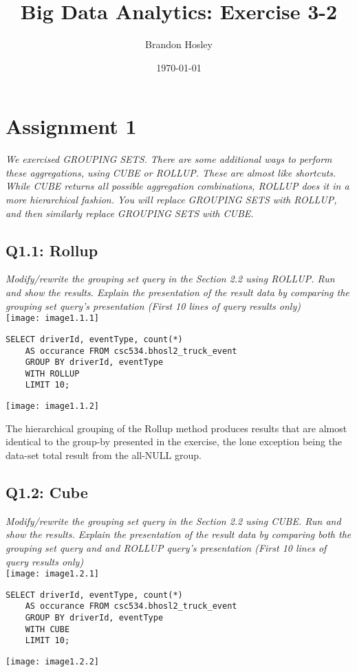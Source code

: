 \documentclass[]{article}
\title{Big Data Analytics: Exercise 3-2}
\author{Brandon Hosley}
\date{\today}
\begin{document}
\maketitle

\section*{Assignment 1}
\emph{We exercised GROUPING SETS. There are some additional ways to perform these aggregations, using CUBE or ROLLUP. These are almost like shortcuts. While CUBE returns all possible aggregation combinations, ROLLUP does it in a more hierarchical fashion. You will replace GROUPING SETS with ROLLUP, and then similarly replace GROUPING SETS with CUBE.}

\subsection*{Q1.1: Rollup} 
\emph{Modify/rewrite the grouping set query in the Section 2.2 using ROLLUP. Run and show the results. Explain the presentation of the result data by comparing the grouping set query’s presentation
(First 10 lines of query results only)} \\
\noindent
\texttt{[image: image1.1.1]} %
\begin{verbatim}
SELECT driverId, eventType, count(*) 
	AS occurance FROM csc534.bhosl2_truck_event 
	GROUP BY driverId, eventType 
	WITH ROLLUP
	LIMIT 10;
\end{verbatim}
\texttt{[image: image1.1.2]} %

The hierarchical grouping of the Rollup method produces results that are almost identical to the group-by presented in the exercise, the lone exception being the data-set total result from the all-NULL group.

\subsection*{Q1.2: Cube} 
\emph{Modify/rewrite the grouping set query in the Section 2.2 using CUBE. Run and show the results. Explain the presentation of the result data by comparing both the grouping set query and and ROLLUP query’s presentation
(First 10 lines of query results only)} \\
\noindent
\texttt{[image: image1.2.1]} %
\begin{verbatim}
SELECT driverId, eventType, count(*) 
	AS occurance FROM csc534.bhosl2_truck_event 
	GROUP BY driverId, eventType 
	WITH CUBE
	LIMIT 10;
\end{verbatim}
\texttt{[image: image1.2.2]} %
\end{document}
